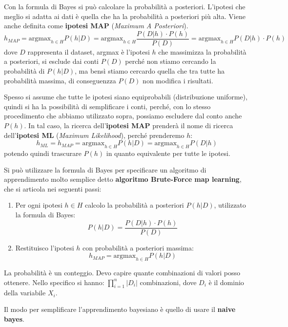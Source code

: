 Con la formula di Bayes si può calcolare la probabilità a posteriori. L'ipotesi
che meglio si adatta ai dati è quella che ha la probabilità a posteriori più alta.
Viene anche definita come \textbf{ipotesi MAP} (\textit{Maximum A Posteriori}).
\begin{equation}
    h_{MAP} = \text{argmax}_{h \in H} P(h|D) = \text{argmax}_{h \in H} \frac{P(D|h) \cdot P(h)}{P(D)} = \text{argmax}_{h \in H} P(D|h) \cdot P(h)
\end{equation}
dove $D$ rappresenta il dataset, argmax è l'ipotesi $h$ che massimizza la probabilità
a posteriori, si esclude dai conti $P(D)$ perché non stiamo cercando la probabilità
di $P(h|D)$, ma bensì stiamo cercardo quella che tra tutte ha probabilità massima, 
di conseguenzza $P(D)$ non modifica i risultati.

Spesso si assume che tutte le ipotesi siano equiprobabili (distribuzione uniforme),
quindi si ha la possibilità di semplificare i conti, perché, con lo stesso 
procedimento che abbiamo utilizzato sopra, possiamo escludere dal conto anche $P(h)$. 
In tal caso, la ricerca dell'\textbf{ipotesi MAP} prenderà il nome di ricerca
dell'\textbf{ipotesi ML} (\textit{Maximum Likelihood}), perché prenderemo $h$:
\begin{equation}
    h_{ML} = h_{MAP} =\text{argmax}_{h \in H} P(h|D) =\text{argmax}_{h \in H} P(D|h)
\end{equation}
potendo quindi trascurare $P(h)$ in quanto equivalente per tutte le ipotesi.

Si può utilizzare la formula di Bayes per specificare un algoritmo di apprendimento
molto semplice detto \textbf{algoritmo Brute-Force map learning}, che si articola
nei seguenti passi:
\begin{enumerate}
    \item Per ogni ipotesi $h \in H$ calcolo la probabilità a posteriori $P(h|D)$,
          utilizzato la formula di Bayes:
          \begin{equation}
              P(h|D) = \frac{P(D|h) \cdot P(h)}{P(D)}
          \end{equation}
    \item Restituisco l'ipotesi $h$ con probabilità a posteriori massima:
          \begin{equation}
              h_{MAP} = \text{argmax}_{h \in H} P(h|D)
          \end{equation}
\end{enumerate}
\begin{nota}
    La probabilità è un conteggio. Devo capire quante combinazioni di valori posso
    ottenere. Nello specifico si hanno: $\prod_{i=1}^n |D_i|$ combinazioni, dove
    $D_i$ è il dominio della variabile $X_i$.
\end{nota}
Il modo per semplificare l'apprendimento bayesiano è quello di usare il \textbf{naive bayes}.

